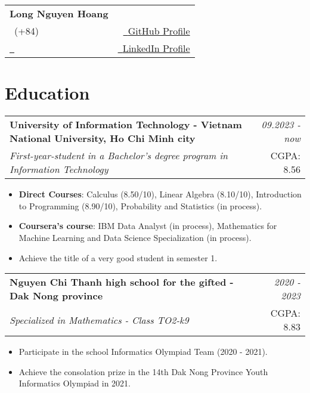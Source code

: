 \documentclass[a4paper,11pt]{article}
\makeatletter
\newcommand{\resumeSubheading}[4]{
\vspace{0.5mm}\item
    \begin{tabular*}{0.98\textwidth}[t]{l@{\extracolsep{\fill}}r}
        \textbf{#1} & \textit{\footnotesize{#4}} \\
        \textit{\footnotesize{#3}} &  \footnotesize{#2}\\
    \end{tabular*}
    \vspace{-2.4mm}
}
\newcommand{\resumeSubHeadingListStart}{}
\newcommand{\resumeItemListStart}{\begin{justify}\begin{itemize}[leftmargin=3ex, rightmargin=2ex, noitemsep,labelsep=1.2mm,itemsep=0mm]\small}
\newcommand{\resumeSubHeadingListEnd}{\vspace{2mm}}
\newcommand{\resumeItemListEnd}{\end{itemize}\end{justify}\vspace{-2mm}}
\newcommand{\name}{Long Nguyen Hoang} %
\newcommand{\phone}{ }
\newcommand{\emaila}{ }
\makeatother
\begin{document}
\selectfont


\parbox{\dimexpr\linewidth-0.3cm\relax}{
\begin{tabularx}{\linewidth}{L r} \\
  \textbf{\Large \name} \\ 
  {\raisebox{0.0\height}{\footnotesize \faPhone}\ (+84) \phone} & \href{https://github.com/nguyenlog205}{\raisebox{0.0\height}{\footnotesize \faGithub}\ {GitHub Profile}}\\
  \href{mailto:\emaila}{\raisebox{0.0\height}{\footnotesize 
 \faEnvelope}\ {\emaila}}&\href{https://www.linkedin.com/in/nguyenlog205/}{\raisebox{0.0\height}{\footnotesize \faLinkedin}\ {LinkedIn Profile}}
\end{tabularx}
}





\section{\textbf{Education}}
  \resumeSubHeadingListStart
    \resumeSubheading
      {University of Information Technology - Vietnam National University, Ho Chi Minh city}{CGPA: 8.56}
      {First-year-student in a Bachelor's degree program in Information Technology}{09.2023 - now}
    \resumeItemListStart
          \item \textbf{Direct Courses}: Calculus (8.50/10), Linear Algebra (8.10/10), Introduction to Programming (8.90/10), Probability and Statistics (in process).
          \item \textbf{Coursera's course}: IBM Data Analyst (in process), Mathematics for Machine Learning and Data Science Specialization (in process).
          \item Achieve the title of a very good student in semester 1.
    \resumeItemListEnd
    \resumeSubheading
      {Nguyen Chi Thanh high school for the gifted - Dak Nong province}{CGPA: 8.83}
      {Specialized in Mathematics - Class TO2-k9}{2020 - 2023} 
      \resumeItemListStart
          \item Participate in the school Informatics Olympiad Team (2020 - 2021).
          \item Achieve the consolation prize in the 14th Dak Nong Province Youth Informatics Olympiad in 2021.
      \resumeItemListEnd
  \resumeSubHeadingListEnd 
\vspace{-5.5mm}
%
\end{document}

